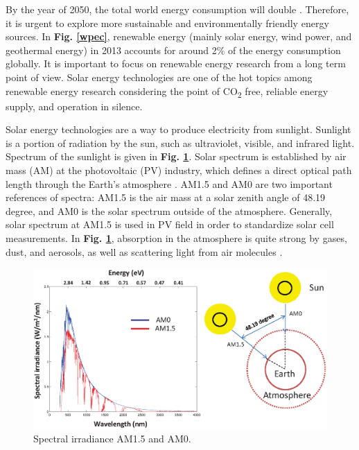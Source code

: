 \documentclass[a4paper, 12pt, titlepage,oneside,drop]{kthesis}
\begin{document}
By the year of 2050, the total world energy consumption will double \cite{iea}. Therefore, it is urgent to explore more sustainable and environmentally friendly energy sources. In \textbf{Fig. \ref{wpec}},
renewable energy (mainly solar energy, wind power, and geothermal energy) in 2013 accounts for around 2\% of the energy consumption globally. It is important to focus on renewable energy research from a 
long term point of view. Solar energy technologies are one of the hot topics among renewable energy research considering the point of CO\textsubscript{2} free, reliable energy supply, and operation in silence.

Solar energy technologies are a way to produce electricity from sunlight. Sunlight is a portion of radiation by the sun, such as ultraviolet, visible,
and infrared light. Spectrum of the sunlight is given in \textbf{Fig. \ref{spectrumsun}}. Solar spectrum is established
by air mass (AM) at the photovoltaic (PV) industry, which defines a direct optical path length through the Earth's atmosphere \cite{smestad2002optoelectronics}. AM1.5 and AM0 are two important references of spectra:
AM1.5 is the air mass at a solar zenith angle of 48.19 degree, and AM0 is the solar spectrum outside of the atmosphere. Generally, solar spectrum at AM1.5 is used in PV field in order to standardize solar cell measurements. 
In \textbf{Fig. \ref{spectrumsun}}, absorption in the atmosphere is quite strong by gases, dust, and aerosols, as well as scattering light from air molecules \cite{seinfeld2012atmospheric}.

\begin{figure}[H]
\centering
\includegraphics[scale=0.6]{irradiancenew.eps}
\caption{Spectral irradiance AM1.5 and AM0.}
\label{spectrumsun}
\end{figure}
\end{document}
